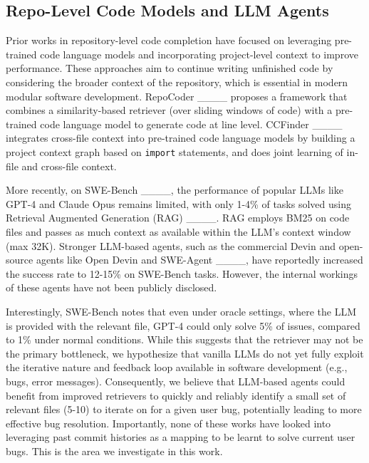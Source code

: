 \subsection{Repo-Level Code Models and LLM Agents}
Prior works in repository-level code completion have focused on leveraging pre-trained code language models and incorporating project-level context to improve performance. These approaches aim to continue writing unfinished code by considering the broader context of the repository, which is essential in modern modular software development. RepoCoder ____ proposes a framework that combines a similarity-based retriever (over sliding windows of code) with a pre-trained code language model to generate code at line level. CCFinder ____ integrates cross-file context into pre-trained code language models by building a project context graph based on \texttt{import} statements, and does joint learning of in-file and cross-file context. 

More recently, on SWE-Bench ____, the performance of popular LLMs like GPT-4 and Claude Opus remains limited, with only 1-4\% of tasks solved using Retrieval Augmented Generation (RAG) ____. RAG employs BM25 on code files and passes as much context as available within the LLM's context window (max 32K). Stronger LLM-based agents, such as the commercial Devin and open-source agents like Open Devin and SWE-Agent ____, have reportedly increased the success rate to 12-15\% on SWE-Bench tasks. However, the internal workings of these agents have not been publicly disclosed.

Interestingly, SWE-Bench notes that even under oracle settings, where the LLM is provided with the relevant file, GPT-4 could only solve 5\% of issues, compared to 1\% under normal conditions. While this suggests that the retriever may not be the primary bottleneck, we hypothesize that vanilla LLMs do not yet fully exploit the iterative nature and feedback loop available in software development (e.g., bugs, error messages). Consequently, we believe that LLM-based agents could benefit from improved retrievers to quickly and reliably identify a small set of relevant files (5-10) to iterate on for a given user bug, potentially leading to more effective bug resolution. Importantly, none of these works have looked into leveraging past commit histories as a mapping to be learnt to solve current user bugs. This is the area we investigate in this work.

